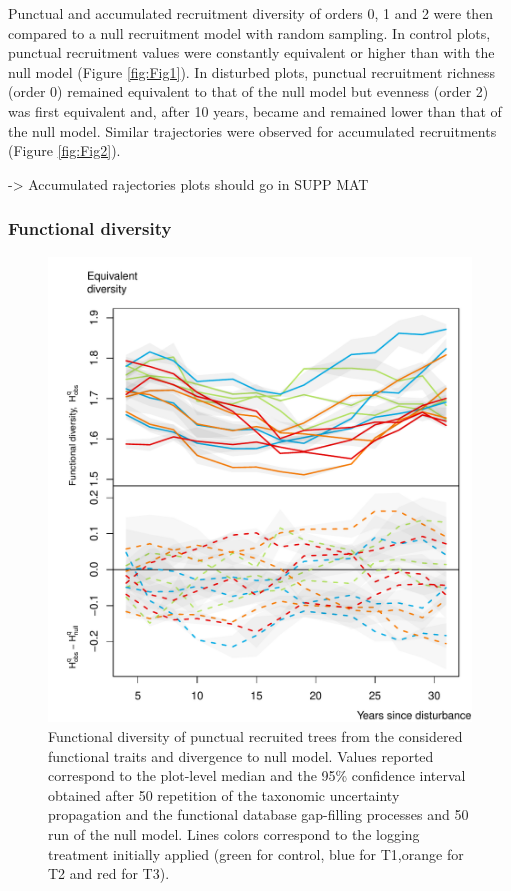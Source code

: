 \documentclass[fleqn,10pt]{ArtEcoFoG} %
\begin{document}
Punctual and accumulated recruitment diversity of orders 0, 1 and 2 were
then compared to a null recruitment model with random sampling. In
control plots, punctual recruitment values were constantly equivalent or
higher than with the null model (Figure \ref{fig:Fig1}). In disturbed
plots, punctual recruitment richness (order 0) remained equivalent to
that of the null model but evenness (order 2) was first equivalent and,
after 10 years, became and remained lower than that of the null model.
Similar trajectories were observed for accumulated recruitments (Figure
\ref{fig:Fig2}).

-\textgreater{} Accumulated rajectories plots should go in SUPP MAT

\subsubsection{Functional diversity}\label{functional-diversity}

\begin{figure}

{\centering \includegraphics[width=0.8\linewidth]{RecruitmentTrajectories_files/figure-latex/Fig3-1} 

}

\caption{Functional diversity of punctual recruited trees from the considered functional traits and divergence to null model. Values reported correspond to the plot-level median and the 95\% confidence interval obtained after 50 repetition of the taxonomic uncertainty propagation and the functional database gap-filling processes and 50 run of the null model. Lines colors correspond to the logging treatment initially applied (green for control, blue for T1,orange for T2 and red for T3).}\label{fig:Fig3}
\end{figure}
\end{document}
